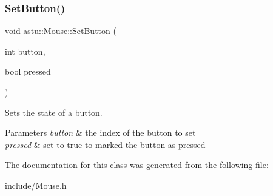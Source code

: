 \subsubsection{\texorpdfstring{Set\+Button()}{SetButton()}}
{\footnotesize\ttfamily void astu\+::\+Mouse\+::\+Set\+Button (\begin{DoxyParamCaption}\item[{int}]{button,  }\item[{bool}]{pressed }\end{DoxyParamCaption})}

Sets the state of a button.


\begin{DoxyParams}{Parameters}
{\em button} & the index of the button to set \\
\hline
{\em pressed} & set to {\ttfamily true} to marked the button as pressed \\
\hline
\end{DoxyParams}


The documentation for this class was generated from the following file\+:\begin{DoxyCompactItemize}
\item 
include/Mouse.\+h\end{DoxyCompactItemize}
